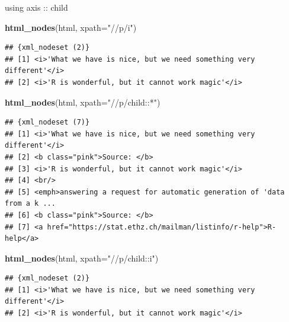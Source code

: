 \documentclass[ignorenonframetext,]{beamer}
\newenvironment{Shaded}{\begin{snugshade}}{\end{snugshade}}
\newcommand{\KeywordTok}[1]{\textcolor[rgb]{0.13,0.29,0.53}{\textbf{{#1}}}}
\newcommand{\DataTypeTok}[1]{\textcolor[rgb]{0.13,0.29,0.53}{{#1}}}
\newcommand{\StringTok}[1]{\textcolor[rgb]{0.31,0.60,0.02}{{#1}}}
\newcommand{\NormalTok}[1]{{#1}}
\begin{document}
\begin{frame}[fragile]{using axis :: child}

\begin{Shaded}
\begin{Highlighting}[]
\KeywordTok{html_nodes}\NormalTok{(html, }\DataTypeTok{xpath=}\StringTok{"//p/i"}\NormalTok{)}
\end{Highlighting}
\end{Shaded}

\begin{verbatim}
## {xml_nodeset (2)}
## [1] <i>'What we have is nice, but we need something very different'</i>
## [2] <i>'R is wonderful, but it cannot work magic'</i>
\end{verbatim}

\begin{Shaded}
\begin{Highlighting}[]
\KeywordTok{html_nodes}\NormalTok{(html, }\DataTypeTok{xpath=}\StringTok{"//p/child::*"}\NormalTok{)}
\end{Highlighting}
\end{Shaded}

\begin{verbatim}
## {xml_nodeset (7)}
## [1] <i>'What we have is nice, but we need something very different'</i>
## [2] <b class="pink">Source: </b>
## [3] <i>'R is wonderful, but it cannot work magic'</i>
## [4] <br/>
## [5] <emph>answering a request for automatic generation of 'data from a k ...
## [6] <b class="pink">Source: </b>
## [7] <a href="https://stat.ethz.ch/mailman/listinfo/r-help">R-help</a>
\end{verbatim}

\begin{Shaded}
\begin{Highlighting}[]
\KeywordTok{html_nodes}\NormalTok{(html, }\DataTypeTok{xpath=}\StringTok{"//p/child::i"}\NormalTok{)}
\end{Highlighting}
\end{Shaded}

\begin{verbatim}
## {xml_nodeset (2)}
## [1] <i>'What we have is nice, but we need something very different'</i>
## [2] <i>'R is wonderful, but it cannot work magic'</i>
\end{verbatim}

\end{frame}
\end{document}
